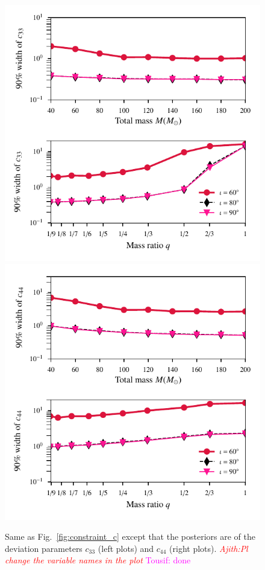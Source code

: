\documentclass[prd,preprintnumbers,twocolumn,eqsecnum,floatfix,a4paper,nofootinbib,superscriptaddress]{revtex4}
\newcommand{\ajith}[1]{\textcolor{red}{\textit{Ajith:#1}}}
\newcommand{\tousif}[1]{\textcolor{magenta}{Tousif: #1}}
\begin{document}
\begin{figure}[tbh]
	\centering
	\includegraphics[scale=0.75]{figs/90_percent_bounds_c3.pdf}
	\includegraphics[scale=0.75]{figs/90_percent_bounds_c4.pdf}
	\caption{Same as Fig.~\ref{fig:constraint_c} except that the posteriors are of the deviation parameters $c_{33}$ (left plots) and  $c_{44}$ (right plots).  \ajith{Pl change the variable names in the plot} \tousif{done}}
	\label{fig:constraint_c33_c44}
\end{figure}
\end{document}
